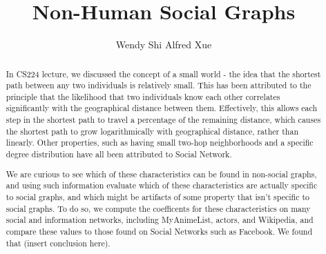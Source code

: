 \documentclass[prodmode,acmtecs]{acmsmall} %
\begin{document}

\title {Non-Human Social Graphs}
\author{Wendy Shi
Alfred Xue
}

\begin{abstract}
In CS224 lecture, we discussed the concept of a small world - the idea that the shortest path between any two individuals
is relatively small. This has been attributed to the principle that the likelihood that two individuals know each other
correlates significantly with the geographical distance between them. Effectively, this allows each step in the shortest
path to travel a percentage of the remaining distance, which causes the shortest path to grow logarithmically with 
geographical distance, rather than linearly. Other properties, such as having small two-hop neighborhoods and a specific
degree distribution have all been attributed to Social Network. 

We are curious to see which of these characteristics can be found in non-social graphs, and using such information evaluate
which of these characteristics are actually specific to social graphs, and which might be artifacts of some property that 
isn't specific to social graphs. To do so, we compute the coefficents for these characteristics on many social and information 
networks, including MyAnimeList, actors, and Wikipedia, and compare these values to those found on Social Networks such as 
Facebook. We found that (insert conclusion here). 
\end{abstract}




\begin{bottomstuff}
\end{bottomstuff}

\maketitle
\end{document}
